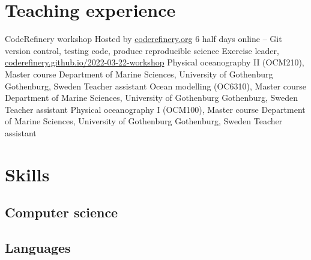 \documentclass[11pt,a4paper,roman]{moderncv}
\begin{document}
\section{Teaching experience}
        {CodeRefinery workshop}
        {Hosted by \href{https://coderefinery.org}{coderefinery.org}}
        {6 half days online -- Git version control, testing code, produce reproducible science}
        {Exercise leader, \href{https://coderefinery.github.io/2022-03-22-workshop}{coderefinery.github.io/2022-03-22-workshop}}
        {}
        {Physical oceanography II (OCM210), Master course}
        {Department of Marine Sciences, University of Gothenburg}
        {Gothenburg, Sweden}
        {Teacher assistant}
        {}
        {Ocean modelling (OC6310), Master course}
        {Department of Marine Sciences, University of Gothenburg}
        {Gothenburg, Sweden}
        {Teacher assistant}
        {}
        {Physical oceanography I (OCM100), Master course}
        {Department of Marine Sciences, University of Gothenburg}
        {Gothenburg, Sweden}
        {Teacher assistant}
        {}


\nocite{*}



        
\section{Skills}


\subsection{Computer science}

\subsection{Languages}
\end{document}
